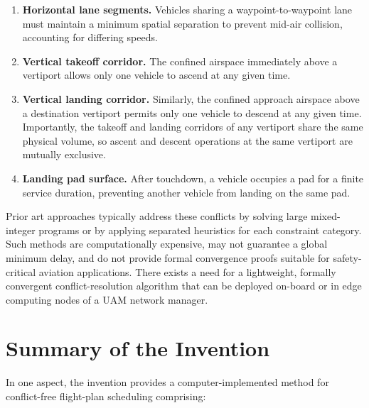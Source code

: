\documentclass[12pt,a4paper]{article}
\begin{document}
\begin{enumerate}[label=(\arabic*)]
  \item \textbf{Horizontal lane segments.}  Vehicles sharing a waypoint-to-waypoint
    lane must maintain a minimum spatial separation to prevent mid-air collision,
    accounting for differing speeds.

  \item \textbf{Vertical takeoff corridor.}  The confined airspace immediately
    above a vertiport allows only one vehicle to ascend at any given time.

  \item \textbf{Vertical landing corridor.}  Similarly, the confined approach
    airspace above a destination vertiport permits only one vehicle to descend
    at any given time.  Importantly, the takeoff and landing corridors of any
    vertiport share the same physical volume, so ascent and descent operations
    at the same vertiport are mutually exclusive.

  \item \textbf{Landing pad surface.}  After touchdown, a vehicle occupies a
    pad for a finite service duration, preventing another vehicle from landing
    on the same pad.
\end{enumerate}

Prior art approaches typically address these conflicts by solving large mixed-
integer programs or by applying separated heuristics for each constraint
category.  Such methods are computationally expensive, may not guarantee a
global minimum delay, and do not provide formal convergence proofs suitable for
safety-critical aviation applications.  There exists a need for a lightweight,
formally convergent conflict-resolution algorithm that can be deployed
on-board or in edge computing nodes of a UAM network manager.

\section{Summary of the Invention}

In one aspect, the invention provides a computer-implemented method for
conflict-free flight-plan scheduling comprising:
\end{document}
